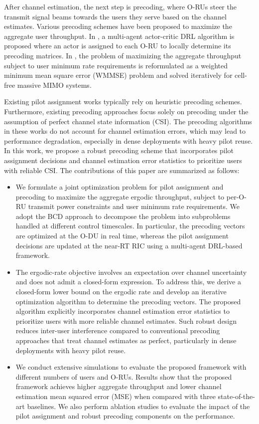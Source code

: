 \documentclass[10pt, conference]{IEEEtran}
\begin{document}
After channel estimation, the next step is precoding, where O-RUs steer the transmit signal beams towards the users they serve based on the channel estimates. Various precoding schemes have been proposed to maximize the aggregate user throughput.
In \cite{MIMO:MHSH1}, a multi-agent actor-critic DRL algorithm is proposed where an actor is assigned to each O-RU to locally determine its precoding matrices.
In \cite{MIMO:MHSH_TWC_2025}, the problem of maximizing the aggregate throughput subject to user minimum rate requirements is reformulated as a weighted minimum mean square error (WMMSE) problem and solved iteratively for cell-free massive MIMO systems.

Existing pilot assignment works \cite{MIMO:pilot1, MIMO:pilot_approx_ratio, MIMO:pilot_quantum, MIMO:pilot_power, MIMO:pilot_power2} typically rely on heuristic precoding schemes. Furthermore, existing precoding approaches \cite{MIMO:MHSH1, MIMO:MHSH_TWC_2025} focus solely on precoding under the assumption of perfect channel state information (CSI). The precoding algorithms in these works do not account for channel estimation errors, which may lead to performance degradation, especially in dense deployments with heavy pilot reuse. In this work, we propose a robust precoding scheme that incorporates pilot assignment decisions and channel estimation error statistics to prioritize users with reliable CSI. The contributions of this paper are summarized as follows:
\begin{itemize}
    \item We formulate a joint optimization problem for pilot assignment and precoding to maximize the aggregate ergodic throughput, subject to per-O-RU transmit power constraints and user minimum rate requirements. We adopt the BCD approach to decompose the problem into subproblems handled at different control timescales. In particular, the precoding vectors are optimized at the O-DU in real time, whereas the pilot assignment decisions are updated at the near-RT RIC using a multi-agent DRL-based framework.
    \item The ergodic-rate objective involves an expectation over channel uncertainty and does not admit a closed-form expression. To address this, we derive a closed-form lower bound on the ergodic rate and develop an iterative optimization algorithm to determine the precoding vectors. The proposed algorithm explicitly incorporates channel estimation error statistics to prioritize users with more reliable channel estimates. Such robust design reduces inter-user interference compared to conventional precoding approaches that treat channel estimates as perfect, particularly in dense deployments with heavy pilot reuse.
    \item We conduct extensive simulations to evaluate the proposed framework with different numbers of users and O-RUs. Results show that the proposed framework achieves higher aggregate throughput and lower channel estimation mean squared error (MSE) when compared with three state-of-the-art baselines. We also perform ablation studies to evaluate the impact of the pilot assignment and robust precoding components on the performance.
\end{itemize}
\end{document}
